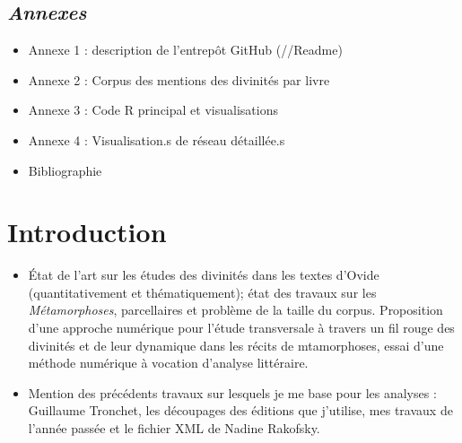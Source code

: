 \documentclass[
  letterpaper,
  DIV=11,
  numbers=noendperiod]{scrreprt}
\providecommand{\tightlist}{%
  \setlength{\itemsep}{0pt}\setlength{\parskip}{0pt}}\usepackage{longtable,booktabs,array}
\begin{document}
\section{\texorpdfstring{\emph{Annexes}}{Annexes}}\label{annexes}

\begin{itemize}
\item
  Annexe 1 : description de l'entrepôt GitHub (//Readme)
\item
  Annexe 2 : Corpus des mentions des divinités par livre
\item
  Annexe 3 : Code R principal et visualisations
\item
  Annexe 4 : Visualisation.s de réseau détaillée.s
\item
  Bibliographie
\end{itemize}


\chapter{Introduction}\label{introduction}

\begin{itemize}
\tightlist
\item
  État de l'art sur les études des divinités dans les textes d'Ovide
  (quantitativement et thématiquement); état des travaux sur les
  \emph{Métamorphoses}, parcellaires et problème de la taille du corpus.
  Proposition d'une approche numérique pour l'étude transversale à
  travers un fil rouge des divinités et de leur dynamique dans les
  récits de mtamorphoses, essai d'une méthode numérique à vocation
  d'analyse littéraire.
\item
  Mention des précédents travaux sur lesquels je me base pour les
  analyses : Guillaume Tronchet, les découpages des éditions que
  j'utilise, mes travaux de l'année passée et le fichier XML de Nadine
  Rakofsky.
\end{itemize}
\end{document}
